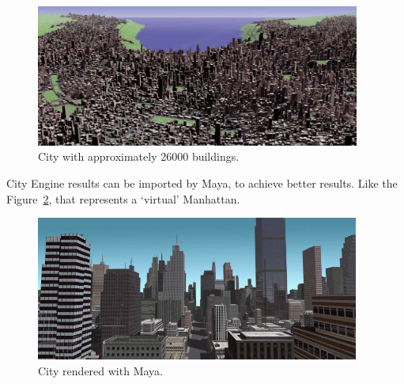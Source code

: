 \begin{figure}[htbp]
  \centering
  \includegraphics[width=0.95\textwidth]{img/Procedural-Modeling-of-Cities/City.png}
  \caption{City with approximately 26000 buildings.}
  \label{fig:bigCity}
\end{figure}

City Engine results can be imported by Maya, to achieve better results. Like the Figure~\ref{fig:cityMaya}, that represents a ‘virtual’ Manhattan.

\begin{figure}[htbp]
  \centering
  \includegraphics[width=0.95\textwidth]{img/Procedural-Modeling-of-Cities/City_Maya.png}
  \caption{City rendered with Maya.}
  \label{fig:cityMaya}
\end{figure}

